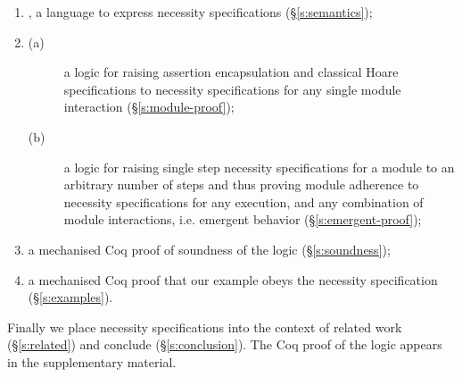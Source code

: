  \begin{enumerate}
 \item
\Chainmail, a language to
express necessity specifications (\S\ref{s:semantics});
 \item
\begin{description}
\item [(a)]
{a logic for raising assertion encapsulation and classical Hoare specifications
to necessity specifications for any single module interaction (\S\ref{s:module-proof});}
\item [(b)]
 {a logic for raising single step necessity specifications for a module to an arbitrary number of steps
and thus proving module adherence to necessity specifications for any execution, and any combination of module interactions, i.e. emergent behavior (\S\ref{s:emergent-proof});}
\end{description}
\item
  a mechanised {Coq} proof of soundness of the logic (\S\ref{s:soundness});
\item
  a  {mechanised Coq} proof that %
  our example obeys the necessity
  specification (\S\ref{s:examples}).
\end{enumerate}


\noindent Finally we place necessity specifications into the context
of related work (\S\ref{s:related}) and conclude (\S\ref{s:conclusion}).
The Coq proof of the logic appears in the
supplementary material.








